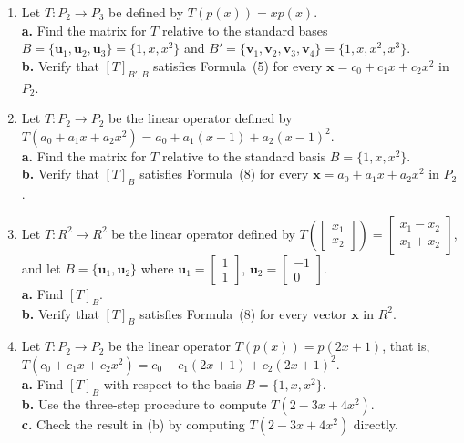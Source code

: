 \documentclass{article}
\begin{document}
\begin{enumerate}
  \item Let $T : P_2 \to P_3$ be defined by $T(p(x)) = xp(x)$.\\
        \textbf{a.} Find the matrix for $T$ relative to the standard bases
        $B = \{\mathbf{u}_1,\mathbf{u}_2,\mathbf{u}_3\} = \{1,x,x^2\}$ and
        $B' = \{\mathbf{v}_1,\mathbf{v}_2,\mathbf{v}_3,\mathbf{v}_4\} = \{1,x,x^2,x^3\}$.\\
        \textbf{b.} Verify that $[T]_{B',B}$ satisfies Formula~(5) for every
        $\mathbf{x} = c_0+c_1x+c_2x^2$ in $P_2$.

  \item[3.] Let $T : P_2 \to P_2$ be the linear operator defined by
        $T(a_0+a_1x+a_2x^2) = a_0+a_1(x-1)+a_2(x-1)^2$.\\
        \textbf{a.} Find the matrix for $T$ relative to the standard basis $B = \{1,x,x^2\}$.\\
        \textbf{b.} Verify that $[T]_B$ satisfies Formula~(8) for every
        $\mathbf{x} = a_0+a_1x+a_2x^2$ in $P_2$.

  \item[4.] Let $T : R^2 \to R^2$ be the linear operator defined by
        $T\!\left(\begin{bmatrix}x_1\\x_2\end{bmatrix}\right)
        = \begin{bmatrix}x_1-x_2\\x_1+x_2\end{bmatrix}$,
        and let $B = \{\mathbf{u}_1,\mathbf{u}_2\}$ where
        $\mathbf{u}_1 = \begin{bmatrix}1\\1\end{bmatrix}$,
        $\mathbf{u}_2 = \begin{bmatrix}-1\\0\end{bmatrix}$.\\
        \textbf{a.} Find $[T]_B$.\\
        \textbf{b.} Verify that $[T]_B$ satisfies Formula~(8) for every vector $\mathbf{x}$ in $R^2$.

  \item[7.] Let $T : P_2 \to P_2$ be the linear operator $T(p(x)) = p(2x+1)$, that is,
        $T(c_0+c_1x+c_2x^2) = c_0+c_1(2x+1)+c_2(2x+1)^2$.\\
        \textbf{a.} Find $[T]_B$ with respect to the basis $B = \{1,x,x^2\}$.\\
        \textbf{b.} Use the three-step procedure to compute $T(2-3x+4x^2)$.\\
        \textbf{c.} Check the result in (b) by computing $T(2-3x+4x^2)$ directly.

\end{enumerate}
\end{document}
